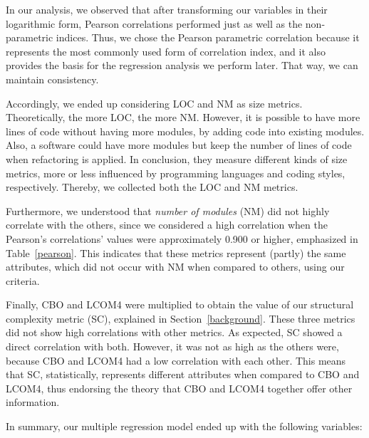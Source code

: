 \documentclass[conference]{IEEEtran}
\newcommand{\TODO}[1]{{\color{red}\textbf{\uwave{#1}}}}
\begin{document}
%
In our analysis, we observed that after transforming our variables in their logarithmic form, 
Pearson correlations performed just as well as the non-parametric indices. 
Thus, we chose the Pearson parametric correlation because it represents the most commonly used form of correlation index, 
and it also provides the basis for the regression analysis we perform later. 
That way, we can maintain consistency. %

Accordingly, we ended up considering LOC and NM as size metrics. Theoretically, 
the more LOC, the more NM.
%
However, it is possible to have more lines of code without having more modules, by
adding code into existing modules. Also, a software could have more modules
but keep the number of lines of code when refactoring is applied.
%
In conclusion, they measure different kinds of size metrics, more or less
influenced by programming languages and coding styles, respectively.
%
Thereby, we collected both the LOC and NM metrics. %

Furthermore, we understood that \emph{number of modules} (NM) did not highly
correlate with the others, since we considered a high correlation when the
Pearson's correlations' values were approximately 0.900 or higher,
emphasized in Table~\ref{pearson}.
%
This indicates that these metrics represent (partly) the same attributes, which did not
occur with NM when compared to others, using our criteria.  %

Finally, CBO and LCOM4 were multiplied to obtain the value of our structural
complexity metric (SC), explained in Section~\ref{background}.
%
These three metrics did not show high correlations with other metrics.
%
As expected, SC showed a direct correlation with both. However, it was not 
as high as the others were, because CBO and LCOM4 had a low correlation
with each other. This means that SC, statistically, represents different attributes
when compared to CBO and LCOM4, thus endorsing  the theory that CBO and LCOM4 together
offer other information. 

In summary, 
our multiple regression model ended up with the following variables:
\end{document}
